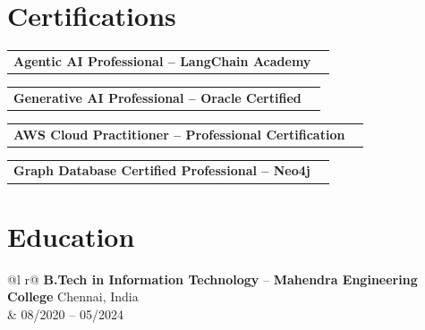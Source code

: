 \documentclass[a4paper,1pt]{article}
\begin{document}
\section{Certifications}

\begin{tabularx}{\linewidth}{ @{}l r@{} }
\textbf{Agentic AI Professional -- LangChain Academy} & \hfill 
\end{tabularx}

\begin{tabularx}{\linewidth}{ @{}l r@{} }
\textbf{Generative AI Professional -- Oracle Certified} & \hfill 
\end{tabularx}

\begin{tabularx}{\linewidth}{ @{}l r@{} }
\textbf{AWS Cloud Practitioner -- Professional Certification} & \hfill 
\end{tabularx}

\begin{tabularx}{\linewidth}{ @{}l r@{} }
\textbf{Graph Database Certified Professional -- Neo4j} & \hfill 
\end{tabularx}

\section{Education}
\begin{tabularx}{\linewidth}{ @{}l r@{} }
\textbf{B.Tech in Information Technology} -- \textbf{Mahendra Engineering College} \hfill Chennai, India \\
& \hfill 08/2020 -- 05/2024 \\[3.75pt]
\\
\end{tabularx}
\end{document}
